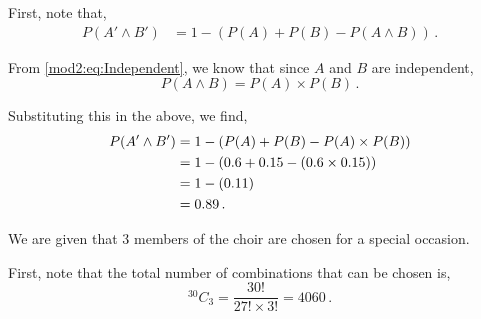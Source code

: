 %
%


\begin{subquestions}
	
\subquestion
First, note that,
\begin{align}
	P(A' \land B') & = 1 - (P(A)+P(B)-P(A \land B)) \,.
\end{align}

From \ref{mod2:eq:Independent}, we know that since $A$ and $B$ are independent,
\begin{equation}
	P(A \land B) = P(A) \times P(B) \,.
\end{equation}

Substituting this in the above, we find,
\begin{align}
	P(A' \land B') & = 1 - (P(A)+P(B)-P(A)\times P(B)) \nonumber \\
	               & = 1 - (0.6+0.15-(0.6\times0.15)) \nonumber \\
	               & = 1 - (0.11) \nonumber \\
	               & = 0.89 \,.
\end{align} 
	

\subquestion

We are given that 3 members of the choir are chosen for a special occasion.

\begin{subsubquestions}
	
\subsubquestion

\begin{subsubsubquestions}
	
\subsubsubquestion

First, note that the total number of combinations that can be chosen is,
\begin{equation}
	^{30}C_3 = \frac{30!}{27! \times 3!} = 4060 \,.
\end{equation}
	

\end{subsubsubquestions}
\end{subsubquestions}
\end{subquestions}
